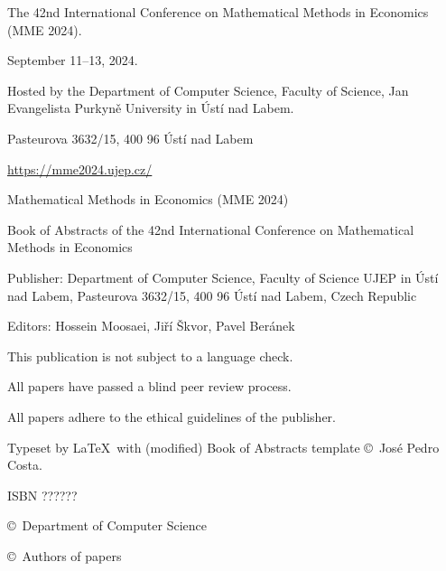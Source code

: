 \thispagestyle{empty}

\begin{flushleft}
The 42nd International Conference on Mathematical Methods in Economics (MME 2024).

September 11--13, 2024.

Hosted by the Department of Computer Science, Faculty of Science, Jan Evangelista Purkyně University in Ústí nad Labem.

Pasteurova 3632/15, 400 96 Ústí nad Labem 

\url{https://mme2024.ujep.cz/}
\end{flushleft}


\begin{flushleft}
Mathematical Methods in Economics (MME 2024)

Book of Abstracts of the 42nd International Conference on Mathematical Methods in Economics

Publisher: Department of Computer Science, Faculty of Science UJEP in Ústí nad Labem, Pasteurova 3632/15, 400 96 Ústí nad Labem, Czech Republic

Editors: Hossein Moosaei, Jiří Škvor, Pavel Beránek

This publication is not subject to a language check.

All papers have passed a blind peer review process.

All papers adhere to the ethical guidelines of the publisher.

Typeset by \LaTeX\ with (modified) Book of Abstracts template \copyright\ José Pedro Costa.

ISBN ??????

\copyright\ Department of Computer Science

\copyright\ Authors of papers
\end{flushleft}
